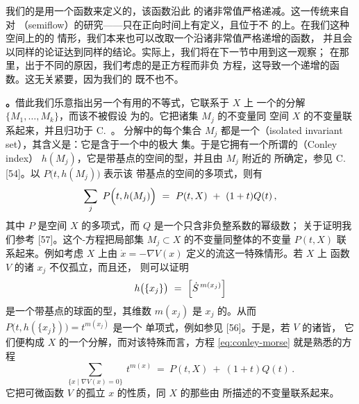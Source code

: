 我们的\trGradientLike\trFlow{}是用一个\trLyapunov{}函数来定义的，该函数沿此%
\trFlow{}的诸非常值\trOrbit{}严格\trMonotone{}递减。这一传统来自对%
\textbf{\trSemiflow}（semiflow）的研究——\trSemiflow{}只在正向时间上有定义，且位于不%
\trCompact{}的\trManifold{}上。在我们这种\trCompact{}空间上的\trFlow{}的%
情形，我们本来也可以改取一个沿诸非常值\trOrbit{}严格递增的\trLyapunov{}函数，%
并且会以同样的论证达到同样的结论。实际上，我们将在下一节中用到这一观察；%
在那里，出于不同的原因，我们考虑的是正\trGradient{}方程而非负\trGradient{}%
方程，这导致一个递增的\trLyapunov{}函数。这无关紧要，因为我们的\trFunctional{}%
既不\trBoundedBelow{}也不\trBoundedAbove。

\textbf{\trhRemark。}\quad 借此我们乐意指出另一个有用的不等式，它联系于 $X$ 上%
一个\trFlow{}的\trMorse{}分解 $\{M_{1},\ldots,M_{k}\}$，而该\trFlow{}不被假设%
为\trGradientLike{}的。它把诸\trInvariant{}集 $M_{j}$ 的\trDynamics{}不变量同%
空间 $X$ 的\trTopology{}不变量联系起来，并且归功于 C.~\trConley。\trMorse{}%
分解中的每个集合 $M_{j}$ 都是一个\textbf{\trIsolatedInvariantSet}（isolated %
invariant set），其含义是：它是含于一个\trCompact\trNeighborhood{}中的极大%
\trInvariant{}集。于是它拥有一个所谓的\textbf{\trConleyIndex}（Conley index）%
$h(M_{j})$，它是带基点的\trCompact{}空间的\trHomotopy{}型，并且由 $M_{j}$ 附近的%
\trFlow{}所确定，参见 C.~\trConley{} [54]。以 $P\bigl(t,h(M_{j})\bigr)$ 表示该%
带基点的\trCompact{}空间的\trPoincare{}多项式，则有
\begin{equation}\label{eq:conley-morse}
\sum_{j}\ P\Bigl(t,h(M_{j})\Bigr)\ =\ P(t,X)\ +\ (1+t)Q(t)\,,
\end{equation}
其中 $P$ 是空间 $X$ 的\trPoincare{}多项式，而 $Q$ 是一个只含非负整系数的幂级数；%
关于证明我们参考 [57]。这个\trConley-\trMorse{}方程把局部\trInvariant{}集%
$M_{j}\subset X$ 的\trDynamics{}不变量同整体的\trTopology{}不变量 $P(t,X)$%
联系起来。例如考虑\trCompact{}\trRiemann\trManifold{} $X$ 上由%
$\dot{x}=-\nabla V(x)$ 定义的\trGradient{}流这一特殊情形。若 $X$ 上\trSmooth{}%
函数 $V$ 的诸\trCriticalPoint{} $x_{j}$ 不仅孤立，而且还\trNondegenerate，%
则可以证明
\[
h\bigl(\{x_{j}\}\bigr)\ =\ \Bigl[\dot{S}^{\,m(x_{j})}\Bigr]
\]
是一个带基点的球面的\trHomotopy{}型，其维数 $m(x_{j})$ 是\trCriticalPoint{}%
$x_{j}$ 的\trMorseIndex。从而 $P\bigl(t,h(\{x_{j}\})\bigr)=t^{m(x_{j})}$ 是一个%
单项式，例如参见 [56]。于是，若 $V$ 的诸\trCriticalPoint{}皆\trNondegenerate，%
它们便构成 $X$ 的一个\trMorse{}分解，而对该特殊\trFlow{}而言，方程%
\eqref{eq:conley-morse} 就是熟悉的\trMorse{}方程
\begin{equation}\label{eq:morse-equation}
\sum_{\{x\mid\nabla V(x)=0\}}\ t^{m(x)}\ =\ P(t,X)\ +\ (1+t)Q(t)\,.
\end{equation}
它把可微函数 $V$ 的孤立\trCriticalPoint{} $x$ 的性质，同 $X$ 的那些由%
\trBettiNumber{}所描述的\trTopology{}不变量联系起来。

